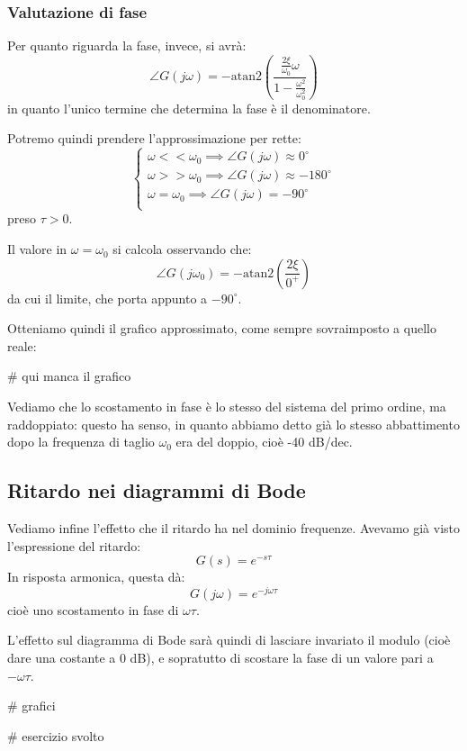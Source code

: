 \documentclass[a4paper,11pt]{article}
\begin{document}
\par\medskip

\subsubsection{Valutazione di fase}
Per quanto riguarda la fase, invece, si avrà: 
$$
\angle G(j \omega) = -\mathrm{atan2} \left( \frac{ \frac{2\xi}{\omega_0}\omega }{ 1 - \frac{\omega^2}{\omega_0^2} } \right) 
$$
in quanto l'unico termine che determina la fase è il denominatore.

Potremo quindi prendere l'approssimazione per rette:
\[
	\begin{cases}
		\omega << \omega_0 \implies \angle G(j\omega) \approx 0^\circ \\ 	
		\omega >> \omega_0 \implies \angle G(j\omega) \approx -180^\circ \\ 	
		\omega = \omega_0 \implies \angle G(j\omega) = -90^\circ \\ 	
	\end{cases}
\]
preso $\tau > 0$.

Il valore in $\omega = \omega_0$ si calcola osservando che:
$$
\angle G(j \omega_0) = -\mathrm{atan2} \left( \frac{ 2 \xi }{ 0^+ } \right)
$$
da cui il limite, che porta appunto a $-90^\circ$.

\par\medskip

\noindent
\begin{minipage}{\textwidth}
Otteniamo quindi il grafico approssimato, come sempre sovraimposto a quello reale:

\begin{center}
	# qui manca il grafico
\end{center}
\end{minipage}

\par\medskip

Vediamo che lo scostamento in fase è lo stesso del sistema del primo ordine, ma raddoppiato: questo ha senso, in quanto abbiamo detto già lo stesso abbattimento dopo la frequenza di taglio $\omega_0$ era del doppio, cioè -40 dB/dec.

\subsection{Ritardo nei diagrammi di Bode}
Vediamo infine l'effetto che il ritardo ha nel dominio frequenze.
Avevamo già visto l'espressione del ritardo:
$$
G(s) = e^{-s \tau}
$$
In risposta armonica, questa dà:
$$
G(j \omega) = e^{-j \omega \tau}
$$
cioè uno scostamento in fase di $\omega \tau$.

L'effetto sul diagramma di Bode sarà quindi di lasciare invariato il modulo (cioè dare una costante a 0 dB), e sopratutto di scostare la fase di un valore pari a $-\omega \tau$.

# grafici

# esercizio svolto
\end{document}
